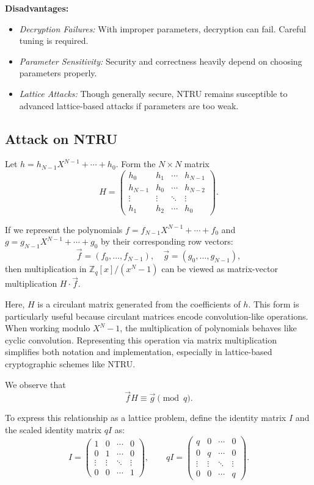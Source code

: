\documentclass[a4paper,12pt]{article}
\begin{document}
\textbf{Disadvantages:}
\begin{itemize}
  \item \textit{Decryption Failures:} With improper parameters, decryption can fail. Careful tuning is required.
  \item \textit{Parameter Sensitivity:} Security and correctness heavily depend on choosing parameters properly.
  \item \textit{Lattice Attacks:} Though generally secure, NTRU remains susceptible to advanced lattice-based attacks if parameters are too weak.
\end{itemize}

\newpage

\subsection{Attack on NTRU}

Let \( h = h_{N-1}X^{N-1} + \cdots + h_0 \). Form the \( N \times N \) matrix
\[
H = 
\begin{pmatrix}
h_0     & h_1     & \cdots & h_{N-1} \\
h_{N-1} & h_0     & \cdots & h_{N-2} \\
\vdots  & \vdots  & \ddots & \vdots  \\
h_1     & h_2     & \cdots & h_0
\end{pmatrix}.
\]

If we represent the polynomials \( f = f_{N-1}X^{N-1} + \cdots + f_0 \) and \( g = g_{N-1}X^{N-1} + \cdots + g_0 \) by their corresponding row vectors:
\[
\vec{f} = (f_0, \dots, f_{N-1}), \quad \vec{g} = (g_0, \dots, g_{N-1}),
\]
then multiplication in \( \mathbb{Z}_q[x]/(x^N - 1) \) can be viewed as matrix-vector multiplication \( H \cdot \vec{f} \).

\vspace{0.5em}

Here, \( H \) is a circulant matrix generated from the coefficients of \( h \). This form is particularly useful because circulant matrices encode convolution-like operations. When working modulo \( X^N - 1 \), the multiplication of polynomials behaves like cyclic convolution. Representing this operation via matrix multiplication simplifies both notation and implementation, especially in lattice-based cryptographic schemes like NTRU.


We observe that
\[
\vec{f} H \equiv \vec{g} \pmod{q}.
\]

To express this relationship as a lattice problem, define the identity matrix \( I \) and the scaled identity matrix \( qI \) as:
\[
I =
\begin{pmatrix}
1 & 0 & \cdots & 0 \\
0 & 1 & \cdots & 0 \\
\vdots & \vdots & \ddots & \vdots \\
0 & 0 & \cdots & 1
\end{pmatrix}, \qquad
qI =
\begin{pmatrix}
q & 0 & \cdots & 0 \\
0 & q & \cdots & 0 \\
\vdots & \vdots & \ddots & \vdots \\
0 & 0 & \cdots & q
\end{pmatrix}.
\]
\end{document}
